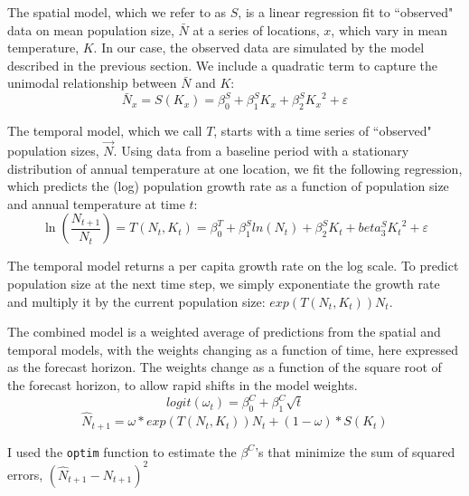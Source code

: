 \documentclass[11pt]{article}
\begin{document}
The spatial model, which we refer to as $S$, is a linear regression fit to ``observed" data on mean population size, $\bar{N}$ at a series of locations, $x$, which vary in mean temperature, $K$. In our case, the observed data are simulated by the model described in the previous section. We include a quadratic term to capture the unimodal relationship between  $\bar{N}$ and $K$:
 \begin{equation}
 \bar{N}_x = S(K_x) = \beta^S_0 +  \beta^S_1 K_x +\beta^S_2 {K_x}^2 + \varepsilon
 \label{eqn:spatial_regression}
 \end{equation}

The temporal model, which we call $T$, starts with a time series of ``observed" population sizes, $\vec{N}$. Using data from a baseline period with a stationary distribution of annual temperature at one location, we fit the following regression, which predicts the (log) population growth rate as a function of population size and annual temperature at time $t$:
 \begin{equation}
 \ln(\frac{N_{t+1}}{N_t}) = T(N_t,K_t) = \beta^T_0 +  \beta^S_1 ln(N_t) +\beta^S_2 K_t + beta^S_3 {K_t}^2 +  \varepsilon
 \label{eqn:temporal_regression}
 \end{equation}
 
The temporal model returns a per capita growth rate on the log scale. To predict population size at the next time step, we simply exponentiate the growth rate and multiply it by the current population size: $exp(T(N_t,K_t)) N_t$.

The combined model is a weighted average of predictions from the spatial and temporal models, with the weights changing as a function of time, here expressed as the forecast horizon. The weights change as a function of the square root of the forecast horizon, to allow rapid shifts in the model weights. 
\begin{equation}
logit(\omega_t)=\beta^C_0 + \beta^C_1 \sqrt{t}
\label{eqn:weights}
\end{equation}
\begin{equation}
\hat{N}_{t+1} = \omega * exp(T(N_{t},K_t)) N_t + (1-\omega) * S(K_t) 
\label{eqn:combined_model}
\end{equation}

I used the \texttt{optim} function to estimate the $\beta^C$'s that minimize the sum of squared errors, $(\hat{N}_{t+1} - N_{t+1})^2$
\end{document}
